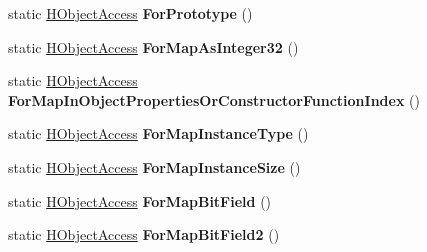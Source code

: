 \begin{DoxyCompactItemize}
\item 
static \hyperlink{classv8_1_1internal_1_1_h_object_access}{H\+Object\+Access} {\bfseries For\+Prototype} ()\hypertarget{classv8_1_1internal_1_1_h_object_access_aa9547474d9129f0993e991de4977aa2b}{}\label{classv8_1_1internal_1_1_h_object_access_aa9547474d9129f0993e991de4977aa2b}

\item 
static \hyperlink{classv8_1_1internal_1_1_h_object_access}{H\+Object\+Access} {\bfseries For\+Map\+As\+Integer32} ()\hypertarget{classv8_1_1internal_1_1_h_object_access_a3ab5f31e69473265a637644e0c993320}{}\label{classv8_1_1internal_1_1_h_object_access_a3ab5f31e69473265a637644e0c993320}

\item 
static \hyperlink{classv8_1_1internal_1_1_h_object_access}{H\+Object\+Access} {\bfseries For\+Map\+In\+Object\+Properties\+Or\+Constructor\+Function\+Index} ()\hypertarget{classv8_1_1internal_1_1_h_object_access_a5c64d96e4a89bdd058e2f3dd4a3cab6b}{}\label{classv8_1_1internal_1_1_h_object_access_a5c64d96e4a89bdd058e2f3dd4a3cab6b}

\item 
static \hyperlink{classv8_1_1internal_1_1_h_object_access}{H\+Object\+Access} {\bfseries For\+Map\+Instance\+Type} ()\hypertarget{classv8_1_1internal_1_1_h_object_access_a78b0228b16002dbae10cc2c42584f401}{}\label{classv8_1_1internal_1_1_h_object_access_a78b0228b16002dbae10cc2c42584f401}

\item 
static \hyperlink{classv8_1_1internal_1_1_h_object_access}{H\+Object\+Access} {\bfseries For\+Map\+Instance\+Size} ()\hypertarget{classv8_1_1internal_1_1_h_object_access_ab3beeb35b5c3dd83b68835838baedf8e}{}\label{classv8_1_1internal_1_1_h_object_access_ab3beeb35b5c3dd83b68835838baedf8e}

\item 
static \hyperlink{classv8_1_1internal_1_1_h_object_access}{H\+Object\+Access} {\bfseries For\+Map\+Bit\+Field} ()\hypertarget{classv8_1_1internal_1_1_h_object_access_a83ac68b376a9753facd3fdb752416db3}{}\label{classv8_1_1internal_1_1_h_object_access_a83ac68b376a9753facd3fdb752416db3}

\item 
static \hyperlink{classv8_1_1internal_1_1_h_object_access}{H\+Object\+Access} {\bfseries For\+Map\+Bit\+Field2} ()\hypertarget{classv8_1_1internal_1_1_h_object_access_ac9ef5ec80f064694f83f5f999bd759e2}{}\label{classv8_1_1internal_1_1_h_object_access_ac9ef5ec80f064694f83f5f999bd759e2}


\end{DoxyCompactItemize}
